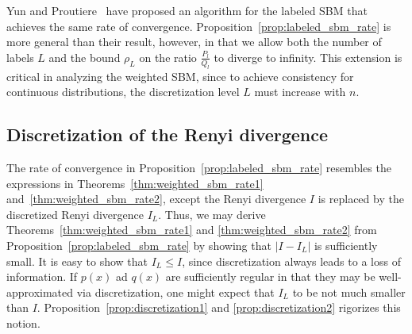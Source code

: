 \documentclass{article}
\begin{document}
Yun and Proutiere~\cite{yun2016optimal} have proposed an algorithm for the labeled SBM that achieves the same rate of convergence. Proposition~\ref{prop:labeled_sbm_rate} is more general than their result, however, in that we allow both the number of labels $L$ and the bound $\rho_L$ on the ratio $\frac{P_l}{Q_l}$ to diverge to infinity. This extension is critical in analyzing the weighted SBM, since to achieve consistency for continuous distributions, the discretization level $L$ must increase with $n$. 

\subsection{Discretization of the Renyi divergence}
\label{sec:discretization_analysis}

The rate of convergence in Proposition~\ref{prop:labeled_sbm_rate} resembles the expressions in Theorems~\ref{thm:weighted_sbm_rate1} and~\ref{thm:weighted_sbm_rate2}, except the Renyi divergence $I$ is replaced by the discretized Renyi divergence $I_L$. Thus, we may derive Theorems~\ref{thm:weighted_sbm_rate1} and \ref{thm:weighted_sbm_rate2} from Proposition~\ref{prop:labeled_sbm_rate} by showing that $|I-I_L|$ is sufficiently small. It is easy to show that $I_L \leq I$, since discretization always leads to a loss of information. If $p(x)$ ad $q(x)$ are sufficiently regular in that they may be well-approximated via discretization, one might expect that $I_L$ to be not much smaller than $I$. Proposition~\ref{prop:discretization1} and \ref{prop:discretization2} rigorizes this notion.
\medskip
\end{document}
